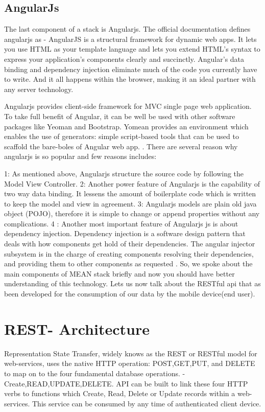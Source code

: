 		\subsection{AngularJs}
		The last component of a stack is Angularjs. The official documentation \cite{Angularjs}defines angularjs as - AngularJS is a structural framework for dynamic web apps. It lets you use HTML as your template language and lets you extend HTML's syntax to express your application's components clearly and succinctly. Angular's data binding and dependency injection eliminate much of the code you currently have to write. And it all happens within the browser, making it an ideal partner with any server technology.
		
		Angularjs provides client-side framework for MVC  \cite{Angularjs} single page web application. To take full benefit of Angular, it can be well be used with other software packages like Yeoman and Bootstrap. Yomean provides an environment which enables the use of generators: simple script-based tools that can be used to scaffold the bare-boles of  Angular web app. \cite{YeomanGenerator}.  There are several reason why angularjs is so popular and few reasons includes: 
		
		1: As mentioned above, Angularjs structure the source code by following the Model View Controller. 
		2: Another power feature of Angularjs is the capability of two way data binding. It lessens the amount of boilerplate code which is written to keep the model and view in agreement.
		3:  Angularjs models are plain old java object (POJO), therefore it is simple to change or append properties without any complications.
		4 : Another most important feature of Angularjs js is about dependency injection. Dependency injection is a software design pattern that deals with how components get hold of their dependencies. The angular injector subsystem is in the charge of creating components  resolving their dependencies, and providing them to other components as requested \cite{AngularJSDi}. 
		So, we spoke about the main components of MEAN stack briefly and  now you should have better understanding  of this technology.  Lets us now talk about the RESTful api that as been developed for the consumption of our data by the mobile device(end user).
		
		\section{REST- Architecture}
		\cite{expressRefWiki}\cite{restProgramming} Representation State Transfer, widely knows as the REST or RESTful model for web-services, uses the native HTTP operation: POST,GET,PUT, and DELETE to map on to the four fundamental database operations. - Create,READ,UPDATE,DELETE. API can be built to link these four HTTP verbs to functions which Create, Read, Delete or Update records within a web-services. This service can be consumed by any time of authenticated client device. 
		
